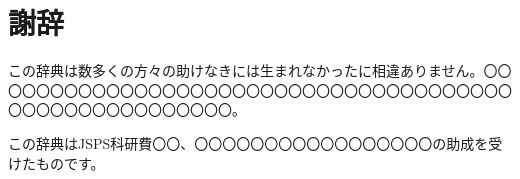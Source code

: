 \chapter*{謝辞}\thispagestyle{plain}

この辞典は数多くの方々の助けなきには生まれなかったに相違ありません。〇〇〇〇〇〇〇〇〇〇〇〇〇〇〇〇〇〇〇〇〇〇〇〇〇〇〇〇〇〇〇〇〇〇〇〇〇〇〇〇〇〇〇〇〇〇〇〇〇〇〇〇〇〇。

この辞典はJSPS科研費〇〇、〇〇〇〇〇〇〇〇〇〇〇〇〇〇〇〇〇の助成を受けたものです。